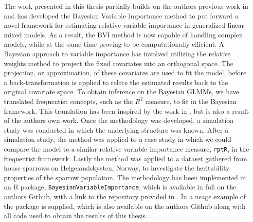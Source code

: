 

The work presented in this thesis partially builds on the authors previous work in \citet{Arnstad:Relative_variable_importance_in_Bayesian_linear_mixed_models:2024} and has developed the Bayesian Variable Importance method to put forward a novel framework for estimating relative variable importance in generalized linear mixed models. 
As a result, the BVI method is now capable of handling complex models, while at the same time proving to be computationally efficient. A Bayesian approach to variable importance has involved utilizing the relative weights method \citep{johnson_relative_weights} to project the fixed covariates into an orthogonal space. The projection, or approximation, of these covariates are used to fit the model, before a back-transformation is applied to relate the estimated results back to the original covariate space. To obtain inference on the Bayesian GLMMs, we have translated frequentist concepts, such as the $R^2$ measure, to fit in the Bayesian framework. This translation has been inspired by the work in \citet{gelman2017rsquared}, but is also a result of the authors own work. Once the methodology was developed, a simulation study was conducted in which the underlying structure was known. After a simulation study, the method was applied to a case study in which we could compare the model to a similar relative variable importance measure, \texttt{rptR}, in the frequentist framework. Lastly the method was applied to a dataset gathered from house sparrows on Helgelandskysten, Norway, to investigate the heritability properties of the sparrow population. The methodology has been implemented in an R package, \texttt{BayesianVariableImportance}, which is available in full on the authors Github, with a link to the repository provided in . In  a usage example of the package is supplied, which is also available on the authors Github along with all code used to obtain the results of this thesis.
\\
\\
